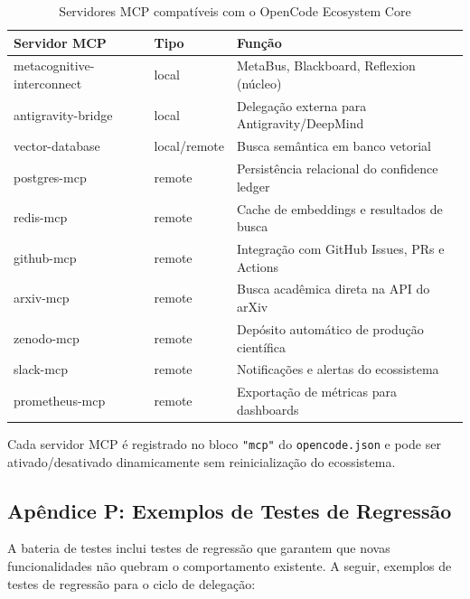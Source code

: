 \begin{table}[H]
\centering
\caption{Servidores MCP compatíveis com o OpenCode Ecosystem Core}
\label{tab:mcp-servers}
\begin{tabular}{@{}llp{5cm}@{}}
\toprule
\textbf{Servidor MCP} & \textbf{Tipo} & \textbf{Função} \\
\midrule
metacognitive-interconnect & local & MetaBus, Blackboard, Reflexion (núcleo) \\
antigravity-bridge & local & Delegação externa para Antigravity/DeepMind \\
vector-database & local/remote & Busca semântica em banco vetorial \\
postgres-mcp & remote & Persistência relacional do confidence ledger \\
redis-mcp & remote & Cache de embeddings e resultados de busca \\
github-mcp & remote & Integração com GitHub Issues, PRs e Actions \\
arxiv-mcp & remote & Busca acadêmica direta na API do arXiv \\
zenodo-mcp & remote & Depósito automático de produção científica \\
slack-mcp & remote & Notificações e alertas do ecossistema \\
prometheus-mcp & remote & Exportação de métricas para dashboards \\
\bottomrule
\end{tabular}
\end{table}

Cada servidor MCP é registrado no bloco \texttt{"mcp"} do \texttt{opencode.json} e pode ser ativado/desativado dinamicamente sem reinicialização do ecossistema.

\subsection{Apêndice P: Exemplos de Testes de Regressão}
\label{sec:apendice-testes-regressao}

A bateria de testes inclui testes de regressão que garantem que novas funcionalidades não quebram o comportamento existente. A seguir, exemplos de testes de regressão para o ciclo de delegação:

